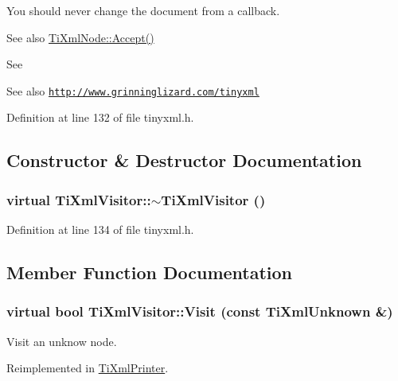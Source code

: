 You should never change the document from a callback.

\begin{DoxySeeAlso}{See also}
\hyperlink{class_ti_xml_node_acc0f88b7462c6cb73809d410a4f5bb86}{TiXmlNode::Accept()}
\end{DoxySeeAlso}
See \begin{DoxySeeAlso}{See also}
\href{http://www.grinninglizard.com/tinyxml}{\tt http://www.grinninglizard.com/tinyxml} 
\end{DoxySeeAlso}


Definition at line 132 of file tinyxml.h.

\subsection{Constructor \& Destructor Documentation}
\hypertarget{class_ti_xml_visitor_a276c739ec4701f27c3f86b8ead095e5a}{
\subsubsection[{$\sim$TiXmlVisitor}]{\setlength{\rightskip}{0pt plus 5cm}virtual TiXmlVisitor::$\sim$TiXmlVisitor ()}}
\label{class_ti_xml_visitor_a276c739ec4701f27c3f86b8ead095e5a}


Definition at line 134 of file tinyxml.h.

\subsection{Member Function Documentation}
\hypertarget{class_ti_xml_visitor_a7e284d607d275c51dac1adb58159ce28}{
\subsubsection[{Visit}]{\setlength{\rightskip}{0pt plus 5cm}virtual bool TiXmlVisitor::Visit (const {\bf TiXmlUnknown} \&)}}
\label{class_ti_xml_visitor_a7e284d607d275c51dac1adb58159ce28}


Visit an unknow node. 

Reimplemented in \hyperlink{class_ti_xml_printer_a08591a15c9a07afa83c24e08b03d6358}{TiXmlPrinter}.

